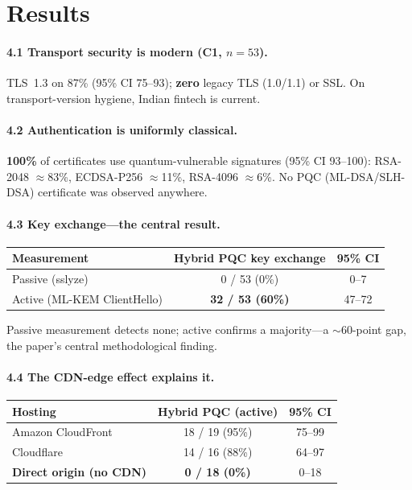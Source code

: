 \documentclass[11pt]{article}
\begin{document}
\section{Results}

\paragraph{4.1 Transport security is modern (C1, $n = 53$).} TLS~1.3 on 87\% (95\% CI 75--93);
\textbf{zero} legacy TLS (1.0/1.1) or SSL. On transport-version hygiene, Indian fintech is current.

\paragraph{4.2 Authentication is uniformly classical.} \textbf{100\%} of certificates use
quantum-vulnerable signatures (95\% CI 93--100): RSA-2048 $\approx$83\%, ECDSA-P256 $\approx$11\%,
RSA-4096 $\approx$6\%. No PQC (ML-DSA/SLH-DSA) certificate was observed anywhere.

\paragraph{4.3 Key exchange---the central result.}

\begin{table}[h]
\centering
\begin{tabular}{lcc}
\toprule
\textbf{Measurement} & \textbf{Hybrid PQC key exchange} & \textbf{95\% CI} \\
\midrule
Passive (sslyze) & 0 / 53 (0\%) & 0--7 \\
Active (ML-KEM ClientHello) & \textbf{32 / 53 (60\%)} & 47--72 \\
\bottomrule
\end{tabular}
\end{table}

\noindent
Passive measurement detects none; active confirms a majority---a ${\sim}60$-point gap, the
paper's central methodological finding.

\paragraph{4.4 The CDN-edge effect explains it.}

\begin{table}[h]
\centering
\begin{tabular}{lcc}
\toprule
\textbf{Hosting} & \textbf{Hybrid PQC (active)} & \textbf{95\% CI} \\
\midrule
Amazon CloudFront & 18 / 19 (95\%) & 75--99 \\
Cloudflare & 14 / 16 (88\%) & 64--97 \\
\textbf{Direct origin (no CDN)} & \textbf{0 / 18 (0\%)} & 0--18 \\
\bottomrule
\end{tabular}
\end{table}
\end{document}
